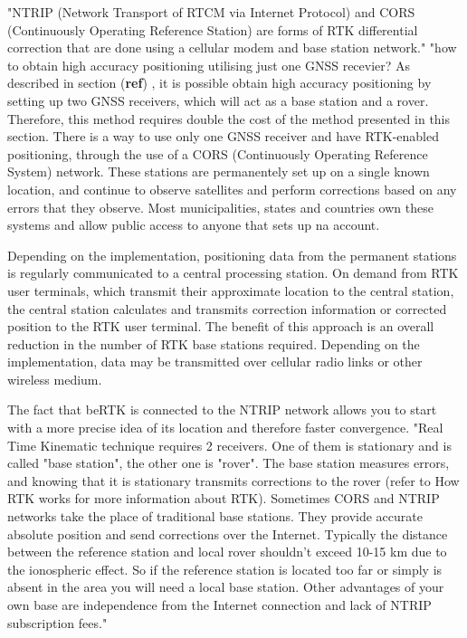 "NTRIP (Network Transport of RTCM via Internet Protocol) and CORS (Continuously Operating Reference Station) are forms of RTK differential correction that are done using a cellular modem and base station network."
"how to obtain high accuracy positioning utilising just one GNSS recevier?
As described in section (\textbf{ref}) , it is possible obtain high accuracy positioning by setting up two GNSS receivers, which will act as a base station and a rover. Therefore, this method requires double the cost of the method presented in this section. There is a way to use only one GNSS receiver and have RTK-enabled positioning, through the use of a CORS (Continuously Operating Reference System) network.%
These stations are permanentely set up on a single known location, and continue to observe satellites and perform corrections based on any errors that they observe. Most municipalities, states and countries own these systems and allow public access to anyone that sets up na account.

Depending on the implementation, positioning data from the permanent stations is regularly communicated to a central processing station.
On demand from RTK user terminals, which transmit their approximate location to the central station, the central station calculates and transmits correction information or corrected position to the RTK user terminal.
The benefit of this approach is an overall reduction in the number of RTK base stations required. Depending on the implementation, data may be transmitted over cellular radio links or other wireless medium.



The fact that beRTK is connected to the NTRIP network allows you to start with a more precise idea of its location and therefore faster convergence.
"Real Time Kinematic technique requires 2 receivers. One of them is stationary and is called "base station", the other one is "rover". The base station measures errors, and knowing that it is stationary transmits corrections to the rover (refer to How RTK works for more information about RTK). Sometimes CORS and NTRIP networks take the place of traditional base stations. They provide accurate absolute position and send corrections over the Internet. Typically the distance between the reference station and local rover shouldn't exceed 10-15 km due to the ionospheric effect. So if the reference station is located too far or simply is absent in the area you will need a local base station. Other advantages of your own base are independence from the Internet connection and lack of NTRIP subscription fees."

